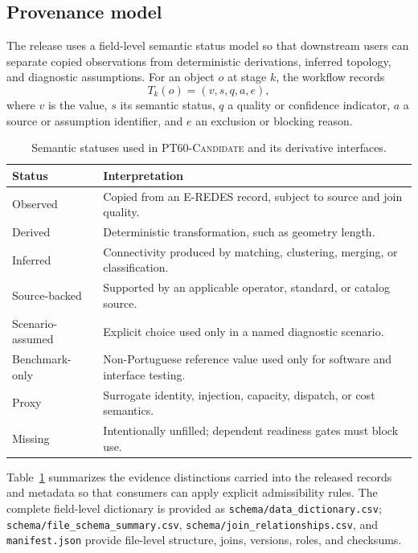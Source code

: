 \documentclass[10pt]{article}
\newcommand{\dataset}{\textsc{PT60-Candidate}\xspace}
\newcommand{\code}[1]{\texttt{#1}}
\begin{document}
\subsection{Provenance model}

The release uses a field-level semantic status model so that downstream users can separate copied observations from deterministic derivations, inferred topology, and diagnostic assumptions. For an object $o$ at stage $k$, the workflow records
\begin{equation}
T_k(o)=(v,s,q,a,e),
\end{equation}
where $v$ is the value, $s$ its semantic status, $q$ a quality or confidence indicator, $a$ a source or assumption identifier, and $e$ an exclusion or blocking reason.

\begin{table}[t]
\centering
\small
\caption{Semantic statuses used in \dataset and its derivative interfaces.}
\label{tab:semantics}
\begin{tabular}{p{}p{}}
\toprule
Status & Interpretation \\
\midrule
Observed & Copied from an E-REDES record, subject to source and join quality. \\
Derived & Deterministic transformation, such as geometry length. \\
Inferred & Connectivity produced by matching, clustering, merging, or classification. \\
Source-backed & Supported by an applicable operator, standard, or catalog source. \\
Scenario-assumed & Explicit choice used only in a named diagnostic scenario. \\
Benchmark-only & Non-Portuguese reference value used only for software and interface testing. \\
Proxy & Surrogate identity, injection, capacity, dispatch, or cost semantics. \\
Missing & Intentionally unfilled; dependent readiness gates must block use. \\
\bottomrule
\end{tabular}
\end{table}

Table~\ref{tab:semantics} summarizes the evidence distinctions carried into the released records and metadata so that consumers can apply explicit admissibility rules. The complete field-level dictionary is provided as \code{schema/data\_dictionary.csv}; \code{schema/file\_schema\_summary.csv}, \code{schema/join\_relationships.csv}, and \code{manifest.json} provide file-level structure, joins, versions, roles, and checksums.
\end{document}
